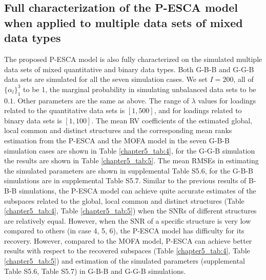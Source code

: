 \subsection{Full characterization of the P-ESCA model when applied to multiple data sets of mixed data types}
The proposed P-ESCA model is also fully characterized on the simulated multiple data sets of mixed quantitative and binary data types. Both G-B-B and G-G-B data sets are simulated for all the seven simulation cases. We set $I=200$, all of $\{ \alpha_l \}_1^3$ to be 1, the marginal probability in simulating unbalanced data sets to be $0.1$. Other parameters are the same as above. The range of $\lambda$ values for loadings related to the quantitative data sets is $[1,500]$, and for loadings related to binary data sets is $[1,100]$. The mean RV coefficients of the estimated global, local common and distinct structures and the corresponding mean ranks estimation from the P-ESCA and the MOFA model in the seven G-B-B simulation cases are shown in Table \ref{chapter5_tab:4}, for the G-G-B simulation the results are shown in Table \ref{chapter5_tab:5}. The mean RMSEs in estimating the simulated parameters are shown in supplemental Table S5.6, for the G-B-B simulations are in supplemental Table S5.7. Similar to the previous results of B-B-B simulations, the P-ESCA model can achieve quite accurate estimates of the subspaces related to the global, local common and distinct structures (Table \ref{chapter5_tab:4}, Table \ref{chapter5_tab:5}) when the SNRs of different structures are relatively equal. However, when the SNR of a specific structure is very low compared to others (in case 4, 5, 6), the P-ESCA model has difficulty for its recovery. However, compared to the MOFA model, P-ESCA can achieve better results with respect to the recovered subspaces (Table \ref{chapter5_tab:4}, Table \ref{chapter5_tab:5}) and estimation of the simulated parameters (supplemental Table S5.6, Table S5.7) in G-B-B and G-G-B simulations.

